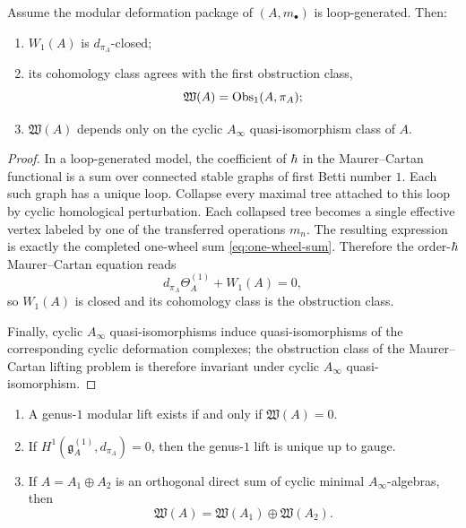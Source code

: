 \begin{theorem}
Assume the modular deformation package of $(A,m_\bullet)$ is loop-generated. Then:
\begin{enumerate}[label=\textup{(\roman*)}]
\item $W_1(A)$ is $d_{\pi_A}$-closed;
\item its cohomology class agrees with the first obstruction class,
\[
\mathfrak W(A)=\operatorname{Obs}_1(A,\pi_A);
\]
\item $\mathfrak W(A)$ depends only on the cyclic $A_\infty$ quasi-isomorphism class of $A$.
\end{enumerate}
\end{theorem}

\begin{proof}
In a loop-generated model, the coefficient of $\hbar$ in the Maurer--Cartan functional is a sum
over connected stable graphs of first Betti number $1$. Each such graph has a unique loop.
Collapse every maximal tree attached to this loop by cyclic homological perturbation. Each
collapsed tree becomes a single effective vertex labeled by one of the transferred operations
$m_n$. The resulting expression is exactly the completed one-wheel sum \eqref{eq:one-wheel-sum}.
Therefore the order-$\hbar$ Maurer--Cartan equation reads
\[
d_{\pi_A}\Theta_A^{(1)}+W_1(A)=0,
\]
so $W_1(A)$ is closed and its cohomology class is the obstruction class.

Finally, cyclic $A_\infty$ quasi-isomorphisms induce quasi-isomorphisms of the corresponding
cyclic deformation complexes; the obstruction class of the Maurer--Cartan lifting problem is
therefore invariant under cyclic $A_\infty$ quasi-isomorphism.
\end{proof}

\begin{corollary}
\begin{enumerate}[label=\textup{(\roman*)}]
\item A genus-$1$ modular lift exists if and only if $\mathfrak W(A)=0$.
\item If $H^1(\mathfrak g_A^{(1)},d_{\pi_A})=0$, then the genus-$1$ lift is unique up to
gauge.
\item If $A=A_1\oplus A_2$ is an orthogonal direct sum of cyclic minimal $A_\infty$-algebras,
then
\[
\mathfrak W(A)=\mathfrak W(A_1)\oplus\mathfrak W(A_2).
\]
\end{enumerate}
\end{corollary}

